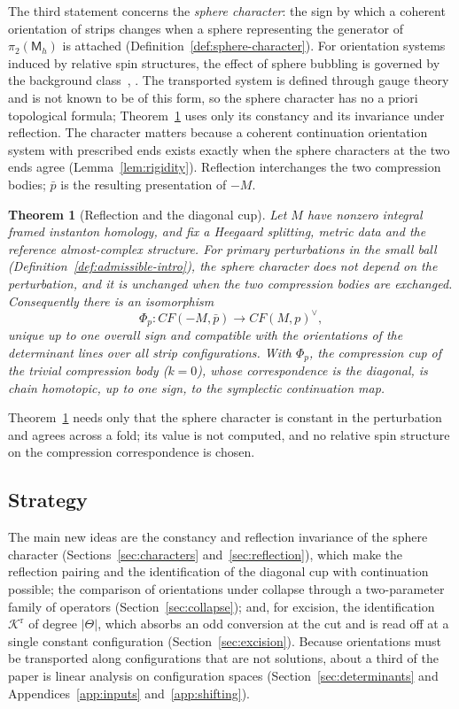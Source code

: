 \documentclass[11pt]{amsart}
\theoremstyle{definition}
\theoremstyle{remark}
\theoremstyle{plain}
\newtheorem{thmletter}{Theorem}
\numberwithin{equation}{section}
\newcommand{\CF}{\mathit{CF}}
\newcommand{\Msf}{\mathsf M}
\begin{document}
The third statement concerns the \emph{sphere character}: the sign by which a coherent orientation
of strips changes when a sphere representing the generator of $\pi_2(\Msf_h)$ is attached
(Definition~\ref{def:sphere-character}). For orientation systems induced by relative spin structures, the effect of sphere bubbling is governed by the background class~\cite[Chapter~8]{FOOO-book}, \cite{WW-orientations}. The transported system is defined through gauge theory and is not known to be of this form, so the sphere character has no a priori topological formula; Theorem~\ref{thm:C} uses only its constancy and its invariance under reflection. The
character matters because a
coherent continuation orientation system with prescribed ends exists exactly when the sphere
characters at the two ends agree (Lemma~\ref{lem:rigidity}). Reflection interchanges the two
compression bodies; $\bar p$ is the resulting presentation of $-M$.

\begin{thmletter}[Reflection and the diagonal cup]\label{thm:C}
Let $M$ have nonzero integral framed instanton homology, and fix a Heegaard splitting, metric
data and the reference almost-complex structure. For primary perturbations in the small ball
(Definition~\ref{def:admissible-intro}), the sphere character does not depend on the perturbation,
and it is unchanged when the two compression bodies are exchanged. Consequently there is an
isomorphism
\[
 \Phi_p:\CF(-M,\bar p)\longrightarrow\CF(M,p)^\vee ,
\]
unique up to one overall sign and compatible with the orientations of the determinant lines over
all strip configurations. With $\Phi_p$, the compression cup of the trivial compression body ($k=0$), whose correspondence is the diagonal, is chain homotopic, up to one sign, to the symplectic continuation map.
\end{thmletter}

Theorem~\ref{thm:C} needs only that the sphere character is constant in the perturbation and agrees across a fold; its value is not
computed, and no relative spin structure on the compression correspondence is chosen.

\subsection{Strategy}
The main new ideas are the constancy and reflection invariance of the sphere character
(Sections~\ref{sec:characters} and~\ref{sec:reflection}), which make the reflection pairing and the
identification of the diagonal cup with continuation possible; the comparison of orientations under
collapse through a two-parameter family of operators (Section~\ref{sec:collapse}); and, for
excision, the identification $\mathcal K^{\mathrm r}$ of degree $|\Theta|$, which absorbs an odd conversion at the
cut and is read off at a single constant configuration (Section~\ref{sec:excision}). Because
orientations must be transported along configurations that are not solutions, about a third of the
paper is linear analysis on configuration spaces (Section~\ref{sec:determinants} and
Appendices~\ref{app:inputs} and~\ref{app:shifting}).
\end{document}
